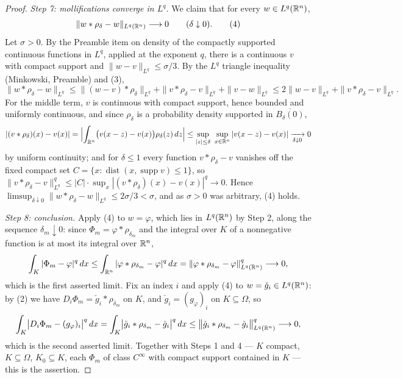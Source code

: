\begin{proof}
\emph{Step 7: mollifications converge in $L^q$.}  We claim that for every
$w\in L^q(\mathbb{R}^n)$,
\[
\|w*\rho_\delta-w\|_{L^q(\mathbb{R}^n)}\longrightarrow0\qquad(\delta\downarrow0).
\tag{4}
\]
Let $\sigma>0$.  By the Preamble item on density of the compactly supported
continuous functions in $L^q$, applied at the exponent $q$, there is a
continuous $v$ with compact support and $\|w-v\|_{L^q}\le\sigma/3$.  By the
$L^q$ triangle inequality (Minkowski, Preamble) and (3),
\[
\|w*\rho_\delta-w\|_{L^q}
\le\|(w-v)*\rho_\delta\|_{L^q}+\|v*\rho_\delta-v\|_{L^q}+\|v-w\|_{L^q}
\le2\|w-v\|_{L^q}+\|v*\rho_\delta-v\|_{L^q} .
\]
For the middle term, $v$ is continuous with compact support, hence bounded and
uniformly continuous, and since $\rho_\delta$ is a probability density supported
in $\overline{B_\delta(0)}$,
\[
|(v*\rho_\delta)(x)-v(x)|
=\Bigl|\int_{\mathbb{R}^n}\bigl(v(x-z)-v(x)\bigr)\rho_\delta(z)\,dz\Bigr|
\le\sup_{|z|\le\delta}\ \sup_{x\in\mathbb{R}^n}|v(x-z)-v(x)|
\xrightarrow[\delta\downarrow0]{}0
\]
by uniform continuity; and for $\delta\le1$ every function
$v*\rho_\delta-v$ vanishes off the fixed compact set
$C=\{x:\operatorname{dist}(x,\operatorname{supp}v)\le1\}$, so
$\|v*\rho_\delta-v\|_{L^q}^q\le|C|\cdot\sup_x|(v*\rho_\delta)(x)-v(x)|^q\to0$.
Hence $\limsup_{\delta\downarrow0}\|w*\rho_\delta-w\|_{L^q}\le2\sigma/3<\sigma$,
and as $\sigma>0$ was arbitrary, (4) holds.

\emph{Step 8: conclusion.}  Apply (4) to $w=\varphi$, which lies in
$L^q(\mathbb{R}^n)$ by Step 2, along the sequence $\delta_m\downarrow0$: since
$\Phi_m=\varphi*\rho_{\delta_m}$ and the integral over $K$ of a nonnegative
function is at most its integral over $\mathbb{R}^n$,
\[
\int_K|\Phi_m-\varphi|^q\,dx\le\int_{\mathbb{R}^n}|\varphi*\rho_{\delta_m}-\varphi|^q\,dx
=\|\varphi*\rho_{\delta_m}-\varphi\|_{L^q(\mathbb{R}^n)}^q\longrightarrow0 ,
\]
which is the first asserted limit.  Fix an index $i$ and apply (4) to
$w=\check g_i\in L^q(\mathbb{R}^n)$: by (2) we have
$D_i\Phi_m=\check g_i*\rho_{\delta_m}$ on $K$, and $\check g_i=(g_\varphi)_i$ on
$K\subseteq\Omega$, so
\[
\int_K\bigl|D_i\Phi_m-(g_\varphi)_i\bigr|^q\,dx
=\int_K\bigl|\check g_i*\rho_{\delta_m}-\check g_i\bigr|^q\,dx
\le\bigl\|\check g_i*\rho_{\delta_m}-\check g_i\bigr\|_{L^q(\mathbb{R}^n)}^q
\longrightarrow0 ,
\]
which is the second asserted limit.  Together with Steps 1 and 4 --- $K$
compact, $K\subseteq\Omega$, $K_0\subseteq K$, each $\Phi_m$ of class
$C^\infty$ with compact support contained in $K$ --- this is the assertion.
\end{proof}
